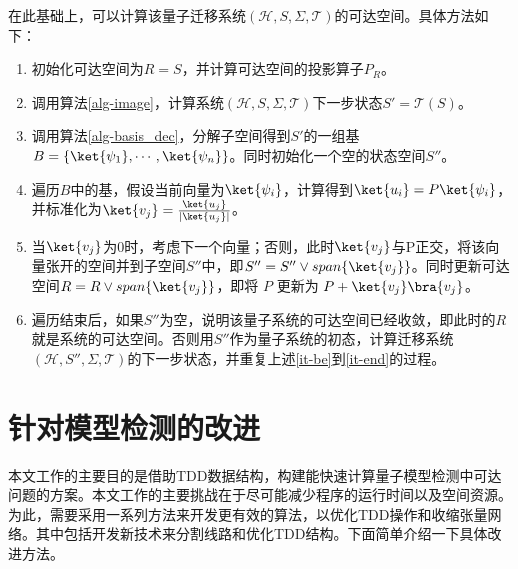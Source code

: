 在此基础上，可以计算该量子迁移系统$(\mathcal{H},S,\Sigma,\mathcal{T})$的可达空间。具体方法如下：
\begin{enumerate}
    \item 初始化可达空间为\(R = S\)，并计算可达空间的投影算子\(P_{R}\)。
    \item 调用算法\ref{alg-image}，计算系统$(\mathcal{H},S,\Sigma,\mathcal{T})$下一步状态\(S'=\mathcal{T}(S)\)。
    \item \label{it-be}调用算法\ref{alg-basis_dec}，分解子空间得到\(S'\)的一组基\(B = \{\ket{\psi_{1}},\cdots,\ket{\psi_{n}}\}\)。同时初始化一个空的状态空间$S''$。
    \item 遍历\(B\)中的基，假设当前向量为\(\ket{\psi_{i}}\)，计算得到\(\ket{u_i}=P\ket{\psi_{i}}\)，并标准化为$\ket{v_j}=\frac{\ket{u_j}}{|\ket{u_j}|}$。
    \item \label{it-end}当$\ket{v_j}$为0时，考虑下一个向量；否则，此时$\ket{v_j}$与P正交，将该向量张开的空间并到子空间$S''$中，即$S''=S''\vee span\{\ket{v_j}\}$。同时更新可达空间$R=R\vee span\{\ket{v_j}\}$，即将 $P$ 更新为 $P+\ket{v_j}\bra{v_j}$。
    \item 遍历结束后，如果$S''$为空，说明该量子系统的可达空间已经收敛，即此时的$R$就是系统的可达空间。否则用$S''$作为量子系统的初态，计算迁移系统$(\mathcal{H},S'',\Sigma,\mathcal{T})$的下一步状态，并重复上述\ref{it-be}到\ref{it-end}的过程。
\end{enumerate}

\section{针对模型检测的改进}
\label{sec-optimize}
本文工作的主要目的是借助TDD数据结构，构建能快速计算量子模型检测中可达问题的方案。本文工作的主要挑战在于尽可能减少程序的运行时间以及空间资源。为此，需要采用一系列方法来开发更有效的算法，以优化TDD操作和收缩张量网络。其中包括开发新技术来分割线路和优化TDD结构。下面简单介绍一下具体改进方法。
